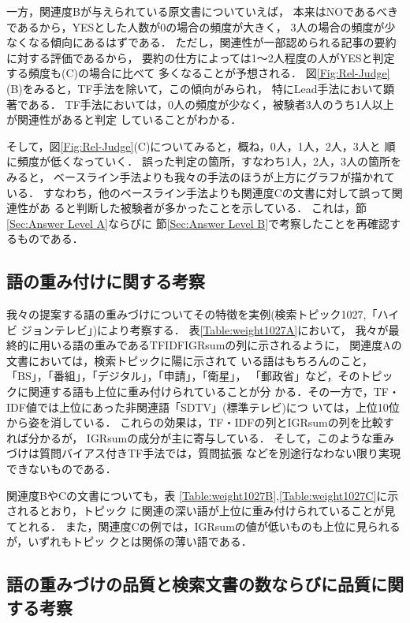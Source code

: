 一方，関連度Bが与えられている原文書についていえば，
本来はNOであるべきであるから，YESとした人数が0の場合の頻度が大きく，
3人の場合の頻度が少なくなる傾向にあるはずである．
ただし，関連性が一部認められる記事の要約に対する評価であるから，
要約の仕方によっては1〜2人程度の人がYESと判定する頻度も(C)の場合に比べて
多くなることが予想される．
図\ref{Fig:Rel-Judge}(B)をみると，TF手法を除いて，この傾向がみられ，
特にLead手法において顕著である．
TF手法においては，0人の頻度が少なく，被験者3人のうち1人以上が関連性があると判定
していることがわかる．

そして，図\ref{Fig:Rel-Judge}(C)についてみると，概ね，0人，1人，2人，3人と
順に頻度が低くなっていく．
誤った判定の箇所，すなわち1人，2人，3人の箇所をみると，
ベースライン手法よりも我々の手法のほうが上方にグラフが描かれている．
すなわち，他のベースライン手法よりも関連度Cの文書に対して誤って関連性があ
ると判断した被験者が多かったことを示している．
これは，節\ref{Sec:Answer Level A}ならびに
節\ref{Sec:Answer Level B}で考察したことを再確認するものである．


\subsection{語の重み付けに関する考察}

我々の提案する語の重みづけについてその特徴を実例(検索トピック1027,「ハイビ
ジョンテレビ」)により考察する．
表\ref{Table:weight1027A}において，
我々が最終的に用いる語の重みであるTFIDFIGRsumの列に示されるように，
関連度Aの文書においては，検索トピックに陽に示されて
いる語はもちろんのこと，「BS」，「番組」，「デジタル」，「申請」，「衛星」，
「郵政省」など，そのトピックに関連する語も上位に重み付けられていることが分
かる．その一方で，TF・IDF値では上位にあった非関連語「SDTV」(標準テレビ)につ
いては，上位10位から姿を消している．
これらの効果は，TF・IDFの列とIGRsumの列を比較すれば分かるが，
IGRsumの成分が主に寄与している．
そして，このような重みづけは質問バイアス付きTF手法では，質問拡張
\cite{Baeza-Yates:ModernInformationRetrieval,Salton:ImprovingRetrievalPerformanceByRelevanceFeedback}
などを別途行なわない限り実現できないものである．

関連度BやCの文書についても，表
\ref{Table:weight1027B},\ref{Table:weight1027C}に示されるとおり，トピック
に関連の深い語が上位に重み付けられていることが見てとれる．
また，関連度Cの例では，IGRsumの値が低いものも上位に見られるが，いずれもトピッ
クとは関係の薄い語である．

\subsection{語の重みづけの品質と検索文書の数ならびに品質に関する考察}
\label{Sec:語の重みづけの品質と検索文書の数ならびに品質に関する考察}

